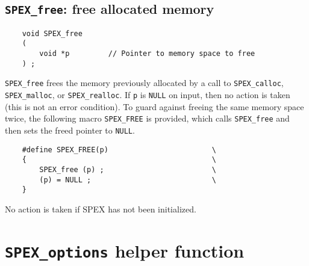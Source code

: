 \documentclass[12pt]{report}
\theoremstyle{definition}
\begin{document}
\subsection{\texttt{SPEX\_free}: free allocated memory}
\label{ss:SPEX_free}

\begin{mdframed}[userdefinedwidth=6in]
{\footnotesize
\begin{verbatim}
    void SPEX_free
    (
        void *p         // Pointer to memory space to free
    ) ;
\end{verbatim}
} \end{mdframed}

\verb|SPEX_free| frees the memory previously allocated by a call to
\verb|SPEX_calloc|, \verb|SPEX_malloc|, or \verb|SPEX_realloc|.  If \verb|p| is
\verb|NULL| on input, then no action is taken (this is not an error condition).
To guard against freeing the same memory space twice, the following macro
\verb|SPEX_FREE| is provided, which calls \verb|SPEX_free| and then sets the
freed pointer to \verb|NULL|.

\begin{mdframed}[userdefinedwidth=6in]
{\footnotesize
\begin{verbatim}
    #define SPEX_FREE(p)                        \
    {                                           \
        SPEX_free (p) ;                         \
        (p) = NULL ;                            \
    }
\end{verbatim}
} \end{mdframed}

No action is taken if SPEX has not been initialized.

\section{\texttt{SPEX\_options} helper function} \label{ss:SPEX_options}
\end{document}
